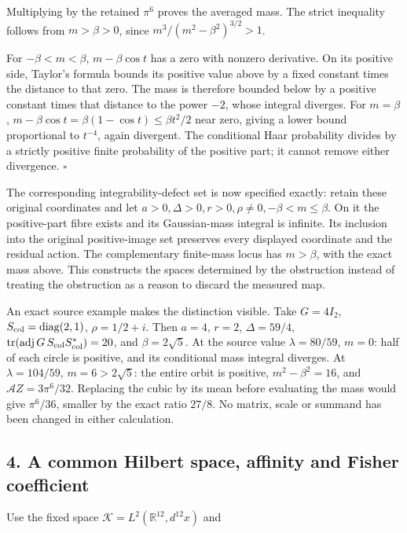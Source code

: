\documentclass[
  11pt,
]{article}
\begin{document}
Multiplying by the retained \(\pi^6\) proves the averaged mass. The
strict inequality follows from \(m>\beta>0\), since
\(m^3/(m^2-\beta^2)^{3/2}>1\).

For \(-\beta<m<\beta\), \(m-\beta\cos t\) has a zero with nonzero
derivative. On its positive side, Taylor's formula bounds its positive
value above by a fixed constant times the distance to that zero. The
mass is therefore bounded below by a positive constant times that
distance to the power \(-2\), whose integral diverges. For \(m=\beta\),
\(m-\beta\cos t=\beta(1-\cos t)\le\beta t^2/2\) near zero, giving a
lower bound proportional to \(t^{-4}\), again divergent. The conditional
Haar probability divides by a strictly positive finite probability of
the positive part; it cannot remove either divergence. \ensuremath{\square}

The corresponding integrability-defect set is now specified exactly:
retain these original coordinates and let
\(a>0,\Delta>0,r>0,\rho\ne0,-\beta<m\le\beta\). On it the positive-part
fibre exists and its Gaussian-mass integral is infinite. Its inclusion
into the original positive-image set preserves every displayed
coordinate and the residual action. The complementary finite-mass locus
has \(m>\beta\), with the exact mass above. This constructs the spaces
determined by the obstruction instead of treating the obstruction as a
reason to discard the measured map.

An exact source example makes the distinction visible. Take \(G=4I_2\),
\(S_{\rm col}=\operatorname{diag}(2,1)\), \(\rho=1/2+i\). Then \(a=4\),
\(r=2\), \(\Delta=59/4\),
\(\operatorname{tr}(\operatorname{adj}G\,S_{\rm col}S_{\rm col}^*)=20\),
and \(\beta=2\sqrt5\). At the source value \(\lambda=80/59\), \(m=0\):
half of each circle is positive, and its conditional mass integral
diverges. At \(\lambda=104/59\), \(m=6>2\sqrt5\): the entire orbit is
positive, \(m^2-\beta^2=16\), and \(\mathcal A Z=3\pi^6/32\). Replacing
the cubic by its mean before evaluating the mass would give
\(\pi^6/36\), smaller by the exact ratio \(27/8\). No matrix, scale or
summand has been changed in either calculation.

\subsection{4. A common Hilbert space, affinity and Fisher
coefficient}\label{a-common-hilbert-space-affinity-and-fisher-coefficient}

Use the fixed space \(\mathcal K=L^2(\mathbb R^{12},d^{12}x)\) and
\end{document}
